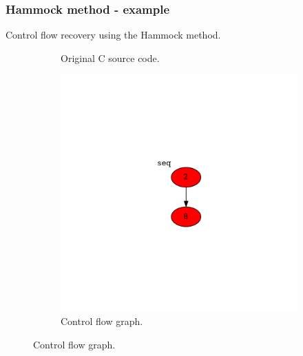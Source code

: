 \documentclass[aspectratio=1610]{beamer}
\begin{document}
\begin{frame}
	\frametitle{Hammock method - example}
	Control flow recovery using the Hammock method.
	\begin{figure}[htbp]
		\centering
		\begin{subfigure}[b]{0.30\textwidth}
			\centering
			
			\caption{Original C source code.}
		\end{subfigure}
		\begin{subfigure}[b]{0.50\textwidth}
			\centering
			\includegraphics[height=0.6\paperheight]{inc/methods/hammock/example/without-break/main_0004a.png}
			\caption{Control flow graph.}
		\end{subfigure}
	\end{figure}
\end{frame}
\end{document}
